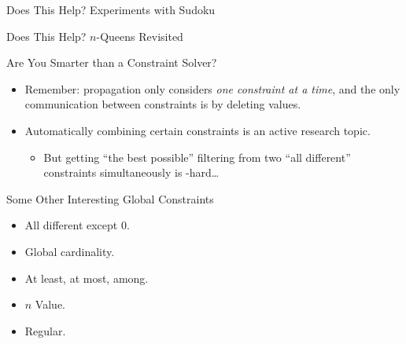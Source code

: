 \documentclass{beamer}
\begin{document}
\begin{frame}{Does This Help? Experiments with Sudoku}
\end{frame}

\begin{frame}{Does This Help? $n$-Queens Revisited}
\end{frame}

\begin{frame}{Are You Smarter than a Constraint Solver?}
     {
        \begin{center}\end{center}
    }

     {
        \begin{itemize}
            \item Remember: propagation only considers \emph{one constraint at a time}, and the only
                communication between constraints is by deleting values.

            \item Automatically combining certain constraints is an active research topic.
                \begin{itemize}
                    \item But getting ``the best possible'' filtering from two ``all different''
                        constraints simultaneously is \NP-hard\ldots
                \end{itemize}
        \end{itemize}
    }
\end{frame}

\begin{frame}{Some Other Interesting Global Constraints}

    \begin{itemize}
        \item All different except 0.
        \item Global cardinality.
        \item At least, at most, among.
        \item $n$ Value.
        \item Regular.
    \end{itemize}

\end{frame}
\end{document}
